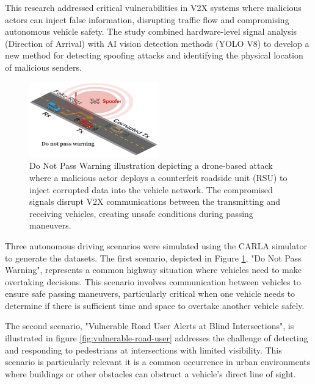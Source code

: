This research addressed critical vulnerabilities in V2X systems where malicious actors can inject false information, disrupting traffic flow and compromising autonomous vehicle safety. The study combined hardware-level signal analysis (Direction of Arrival) with AI vision detection methods (YOLO V8) to develop a new method for detecting spoofing attacks and identifying the physical location of malicious senders.

\begin{figure} [!ht]
    \centering
    \includegraphics[width=0.5\textwidth]{parts/figuras/DoNotPassWarning.png}
    \caption{Do Not Pass Warning illustration depicting a drone-based attack where a malicious actor deploys a counterfeit roadside unit (RSU) to inject corrupted data into the vehicle network. The compromised signals disrupt V2X communications between the transmitting and receiving vehicles, creating unsafe conditions during passing maneuvers.}
    \label{fig:do-not-pass-warning}
\end{figure}

Three autonomous driving scenarios were simulated using the CARLA simulator to generate the datasets. The first scenario, depicted in Figure \ref{fig:do-not-pass-warning}, "Do Not Pass Warning", represents a common highway situation where vehicles need to make overtaking decisions. This scenario involves communication between vehicles to ensure safe passing maneuvers, particularly critical when one vehicle needs to determine if there is sufficient time and space to overtake another vehicle safely.

The second scenario, "Vulnerable Road User Alerts at Blind Intersections", is illustrated in figure \ref{fig:vulnerable-road-user} addresses the challenge of detecting and responding to pedestrians at intersections with limited visibility. This scenario is particularly relevant it is a common occurrence in urban environments where buildings or other obstacles can obstruct a vehicle's direct line of sight.

